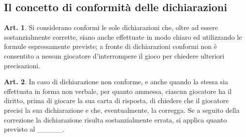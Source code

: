 \documentclass[italian,a4paper]{article}
\theoremstyle{definition}
\newtheorem{art}{Art.}
\begin{document}
\subsection{Il concetto di conformità delle dichiarazioni}
\begin{art}
Si considerano conformi le sole dichiarazioni che, oltre ad essere sostanzialmente corrette, siano anche effettuate in modo chiaro ed utilizzando le formule espressamente previste; a fronte di dichiarazioni conformi non è consentito a nessun giocatore d'interrompere il gioco per chiedere ulteriori precisazioni.
\end{art}
\begin{art}
In caso di dichiarazione non conforme, e anche quando la stessa sia effettuata in forma non verbale, per quanto ammessa, ciascun giocatore ha il diritto, prima di giocare la sua carta di risposta, di chiedere che il giocatore precisi la sua dichiarazione e che, eventualmente, la corregga. Se a seguito della correzione la dichiarazione risulta sostanzialmente errata, si applica quanto previsto al _____.
\end{art}
\end{document}
